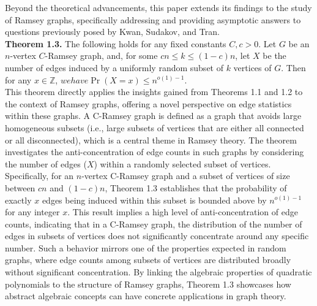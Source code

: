 Beyond the theoretical advancements, this paper extends its findings to the study of Ramsey graphs, specifically addressing and providing asymptotic answers to questions previously posed by Kwan, Sudakov, and Tran.\\\newline
\textbf{Theorem 1.3.} The following holds for any fixed constants $C, c > 0$. Let $G$ be an $n$-vertex $C$-Ramsey graph, and, for some $cn \leq k \leq (1 - c)n$, let $X$ be the number of edges induced by a uniformly random subset of $k$ vertices of $G$. Then for any $x \in \mathbb{Z}$, $we have \Pr(X = x) \leq n^{o(1)-1}$.\\ This theorem directly applies the insights gained from Theorems 1.1 and 1.2 to the context of Ramsey graphs, offering a novel perspective on edge statistics within these graphs. A C-Ramsey graph is defined as a graph that avoids large homogeneous subsets (i.e., large subsets of vertices that are either all connected or all disconnected), which is a central theme in Ramsey theory. The theorem investigates the anti-concentration of edge counts in such graphs by considering the number of edges ($X$) within a randomly selected subset of vertices.
Specifically, for an $n$-vertex C-Ramsey graph and a subset of vertices of size between $cn$ and $(1-c)n$, Theorem 1.3 establishes that the probability of exactly $x$ edges being induced within this subset is bounded above by $n^{o(1)-1}$ for any integer $x$. This result implies a high level of anti-concentration of edge counts, indicating that in a C-Ramsey graph, the distribution of the number of edges in subsets of vertices does not significantly concentrate around any specific number. Such a behavior mirrors one of the properties expected in random graphs, where edge counts among subsets of vertices are distributed broadly without significant concentration.
By linking the algebraic properties of quadratic polynomials to the structure of Ramsey graphs, Theorem 1.3 showcases how abstract algebraic concepts can have concrete applications in graph theory.\\\newline
